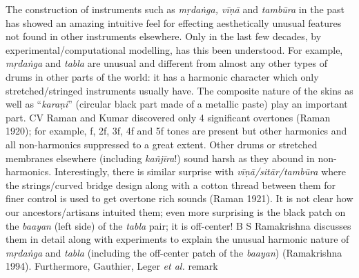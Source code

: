 The construction of instruments such as \textsl{mṛdaṅga, vīṇā} and \textsl{tambūra} in the past has showed an amazing intuitive feel for effecting aesthetically unusual features not found in other instruments elsewhere. Only in the last few decades, by experimental/computational modelling, has this been understood. For example, \textsl{mṛdaṅga} and \textsl{tabla} are unusual and different from almost any other types of drums in other parts of the world: it has a harmonic character which only stretched/\-stringed instruments usually have. The composite nature of the skins as well as “\textsl{karaṇi}” (circular black part made of a metallic paste) play an important part.  CV Raman and Kumar discovered only 4 significant overtones (Raman 1920); for example, f, 2f, 3f, 4f and 5f tones are present but other harmonics and all non-harmonics suppressed to a great extent. Other drums or stretched membranes elsewhere (including \textsl{kañjīra}!) sound harsh as they abound in non-harmonics. Interestingly, there is similar surprise with \textsl{vīṇā/sitār/tambūra} where the strings/curved bridge design along with a cotton thread between them for finer control is used to get overtone rich sounds (Raman 1921). It is not clear how our ancestors/artisans intuited them; even more surprising is the black patch on the \textsl{baayan} (left side) of the \textsl{tabla} pair; it is off-center! B S Ramakrishna discusses them in detail along with experiments to explain the unusual harmonic nature of \textsl{mṛdaṅga} and \textsl{tabla} (including the off-center patch of the \textsl{baayan}) (Ramakrishna 1994). Furthermore, Gauthier, Leger \textsl{et al.} remark 

